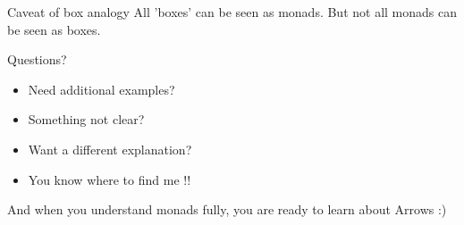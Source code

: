 \begin{frame}[fragile]{}
    \begin{block}{Caveat of box analogy}
        All 'boxes' can be seen as monads. But not all monads can be seen as boxes.
    \end{block}
\end{frame}

\begin{frame}[t]{}
    \begin{block}{Questions?}
        \begin{itemize}
            \item Need additional examples?
            \item Something not clear?
            \item Want a different explanation?
            \item You know where to find me !!
        \end{itemize}
    \end{block}
    \begin{block}{}
        And when you understand monads fully, you are ready to learn about Arrows :)
    \end{block}
\end{frame}

